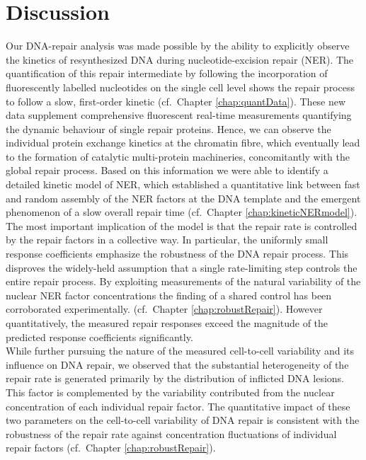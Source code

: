 \chapter{Discussion}


Our DNA-repair analysis was made possible by the ability to explicitly observe the kinetics of resynthesized DNA during nucleotide-excision repair (NER). The quantification of this repair intermediate by following the incorporation of fluorescently labelled nucleotides on the single cell level shows the repair process to follow a slow, first-order kinetic (cf.\ Chapter \ref{chap:quantData}). These new data supplement comprehensive fluorescent real-time measurements quantifying the dynamic behaviour of single repair proteins. Hence, we can observe the individual protein exchange kinetics at the chromatin fibre, which eventually lead to the formation of catalytic multi-protein machineries, concomitantly with the global repair process. Based on this information we were able to identify a detailed kinetic model of NER, which established a quantitative link between fast and random assembly of the NER factors at the DNA template and the emergent phenomenon of a slow overall repair time (cf.\ Chapter \ref{chap:kineticNERmodel}). The most important implication of the model is that the repair rate is controlled by the repair factors in a collective way. In particular, the uniformly small response coefficients emphasize the robustness of the DNA repair process. This disproves the widely-held assumption that a single rate-limiting step controls the entire repair process. By exploiting measurements of the natural variability of the nuclear NER factor concentrations the finding of a shared control has been corroborated experimentally. (cf.\ Chapter \ref{chap:robustRepair}). However quantitatively, the measured repair responses exceed the magnitude of the predicted response coefficients significantly.\\
While further pursuing the nature of the measured cell-to-cell variability and its influence on DNA repair, we observed that the substantial heterogeneity of the repair rate is generated primarily by the distribution of inflicted DNA lesions. This factor is complemented by the variability contributed from the nuclear concentration of each individual repair factor. The quantitative impact of these two parameters on the cell-to-cell variability of DNA repair is consistent with the robustness of the repair rate against concentration fluctuations of individual repair factors (cf.\ Chapter \ref{chap:robustRepair}).\\  
